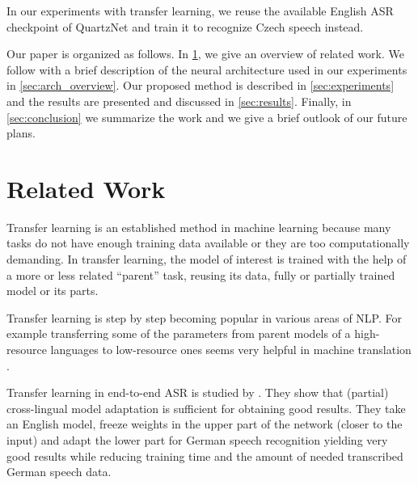 In our experiments with transfer learning, 
we reuse the available English ASR checkpoint of QuartzNet  and train it to recognize Czech speech instead.


Our paper is organized as follows. In \cref{sec:related_work}, we give an overview of related work. We follow with a brief description of the neural architecture used in our experiments in \cref{sec:arch_overview}.
Our proposed method is described in \cref{sec:experiments} and the results are presented and discussed in \cref{sec:results}.
Finally, in \cref{sec:conclusion} we summarize the work and we give a brief outlook of our future plans.


\section{Related Work}
\label{sec:related_work}

Transfer learning  is an established method in machine learning because many tasks do not have enough training data available or they are too computationally demanding. In transfer learning, the model of interest is trained with the help of a more or less related ``parent'' task, reusing its data, fully or partially trained model or its parts.

Transfer learning is step by step becoming popular in various areas of NLP. 
For example transferring some of the parameters from parent models of a high-resource languages to low-resource ones seems very helpful in machine translation .

Transfer learning in end-to-end ASR is studied by  . They show that (partial) cross-lingual model adaptation is sufficient for obtaining good results. They take an English model, freeze weights in the upper part of the network (closer to the input) and adapt the lower part for German speech recognition yielding very good results while reducing training time and the amount of needed transcribed German speech data.


